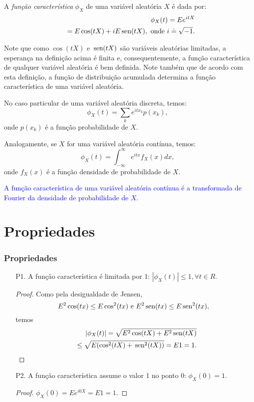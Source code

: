 \begin{frame}

\begin{defi}
A {\em função característica} $\phi_X$ de uma variável aleatória $X$
é dada por:
\begin{eqnarray}
& & \phi_X(t)=Ee^{itX}\nonumber\\
& & =E\cos(tX)+iE\mbox{\,sen}(tX),\mbox{ onde }i\doteq\sqrt{-1}.\nonumber
\end{eqnarray}
\end{defi}

Note que como $\cos(tX)$ e $\mbox{\,sen}(tX)$ são variáveis
aleatórias limitadas, a esperança na definição acima é finita e,
consequentemente, a função característica de qualquer variável
aleatória é bem definida. Note também que de acordo com esta
definição, a função de distribuição acumulada determina a função
característica de uma variável aleatória.



No caso particular de uma variável aleatória discreta, temos:
$$\phi_X(t)=\sum_{k}e^{itx_k}p(x_k),$$
onde $p(x_k)$ é a função probabilidade de $X$.

Analogamente, se $X$ for uma variável aleatória contínua, temos:
$$\phi_X(t)=\int_{-\infty}^{\infty} e^{itx}f_X(x)dx,$$
onde $f_X(x)$ é a função densidade de probabilidade de $X$.

\textcolor{blue}{A função característica de uma variável aleatória contínua é a
transformada de Fourier da densidade de probabilidade de $X$. }

\end{frame}

\section{Propriedades}
\begin{frame}
\frametitle{\textbf{Propriedades}}

\begin{enumerate}
\item[P1.] A função característica é limitada por 1: $|\phi_X(t)|\leq 1, \forall t\in R$.

\begin{proof} Como pela desigualdade de Jensen, $$E^2\cos(tx)\leq E\cos^2(tx)\mbox{
e }E^2\mbox{\,sen}(tx)\leq E\mbox{\,sen}^2(tx),$$ temos
\begin{eqnarray}
& & |\phi_X(t)|=\sqrt{E^2\cos(tX)+E^2\mbox{\,sen}(tX)} \nonumber\\
& & \leq
\sqrt{E(\cos^2(tX)+\mbox{\,sen}^2(tX))}=E1=1.\nonumber
\end{eqnarray} \end{proof}
\item[P2.] A função característica assume o valor 1 no ponto 0:
$\phi_X(0)=1$.

\begin{proof} $\phi_X(0)=Ee^{i0X}=E1=1.$ \end{proof}
\end{enumerate}

\end{frame}


